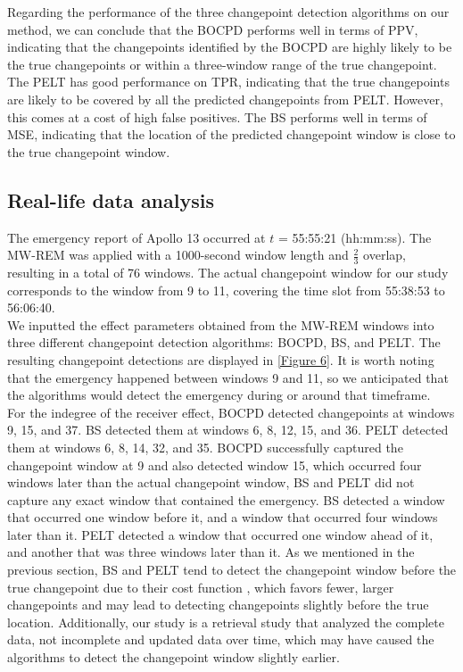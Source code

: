 \documentclass[]{interact}
\theoremstyle{plain}%
\theoremstyle{definition}
\theoremstyle{remark}
\begin{document}
{    Regarding the performance of the three changepoint detection algorithms on our method, we can conclude that the BOCPD performs well in terms of PPV, indicating that the changepoints identified by the BOCPD are highly likely to be the true changepoints or within a three-window range of the true changepoint. The PELT has good performance on TPR, indicating that the true changepoints are likely to be covered by all the predicted changepoints from PELT. However, this comes at a cost of high false positives. The BS performs well in terms of MSE, indicating that the location of the predicted changepoint window is close to the true changepoint window.
    
	\subsection{Real-life data analysis} \label{res:Apollo 13}
	
	\hspace{0.28cm} The emergency report of Apollo 13 occurred at $t$ = 55:55:21 (hh:mm:ss). The MW-REM was applied with a 1000-second window length and $\frac{2}{3}$ overlap, resulting in a total of 76 windows. The actual changepoint window for our study corresponds to the window from 9 to 11, covering the time slot from 55:38:53 to 56:06:40. \\
	
	We inputted the effect parameters obtained from the MW-REM windows into three different changepoint detection algorithms: BOCPD, BS, and PELT. The resulting changepoint detections are displayed in \autoref{Figure 6}. It is worth noting that the emergency happened between windows 9 and 11, so we anticipated that the algorithms would detect the emergency during or around that timeframe. \\
	
	For the indegree of the receiver effect, BOCPD detected changepoints at windows 9, 15, and 37. BS detected them at windows 6, 8, 12, 15, and 36. PELT detected them at windows 6, 8, 14, 32, and 35. BOCPD successfully captured the changepoint window at 9 and also detected window 15, which occurred four windows later than the actual changepoint window, BS and PELT did not capture any exact window that contained the emergency. BS detected a window that occurred one window before it, and a window that occurred four windows later than it. PELT detected a window that occurred one window ahead of it, and another that was three windows later than it. As we mentioned in the previous section, BS and PELT tend to detect the changepoint window before the true changepoint due to their cost function \cite{killickOptimalDetectionChangepoints2012}, which favors fewer, larger changepoints and may lead to detecting changepoints slightly before the true location. Additionally, our study is a retrieval study that analyzed the complete data, not incomplete and updated data over time, which may have caused the algorithms to detect the changepoint window slightly earlier. \\
	
}
\end{document}
